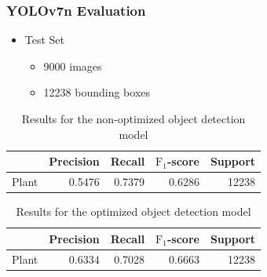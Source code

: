 \documentclass{beamer}
\begin{document}
\begin{frame}
  \frametitle{YOLOv7n Evaluation}
  \begin{itemize}
    \setlength{\itemsep}{1.1\baselineskip}
  \item Test Set
    \begin{itemize}
    \item \num{9000} images
    \item \num{12238} bounding boxes \pause
    \end{itemize}
  \end{itemize}
  \begin{table}[h]
    \centering
    \begin{tabular}{lrrrr}
      \toprule
      {} &  Precision &    Recall &  $\mathrm{F}_1$-score &  Support \\
      \midrule
      Plant        &   \num{0.5476} &  \num{0.7379} &  \num{0.6286} &  \num{12238} \\
      \bottomrule
    \end{tabular}
    \caption{\scriptsize Results for the non-optimized object detection model}
    \label{tab:yolo-metrics}
  \end{table}
  \begin{table}[h]
    \centering
    \begin{tabular}{lrrrr}
      \toprule
      {} &  Precision &    Recall &  $\mathrm{F}_1$-score &  Support \\
      \midrule
      Plant        &   \num{0.6334} &  \num{0.7028} &  \num{0.6663} &  \num{12238} \\
      \bottomrule
    \end{tabular}
    \caption{\scriptsize Results for the optimized object detection model}
    \label{tab:yolo-metrics-hyp}
  \end{table}
\end{frame}
\end{document}
